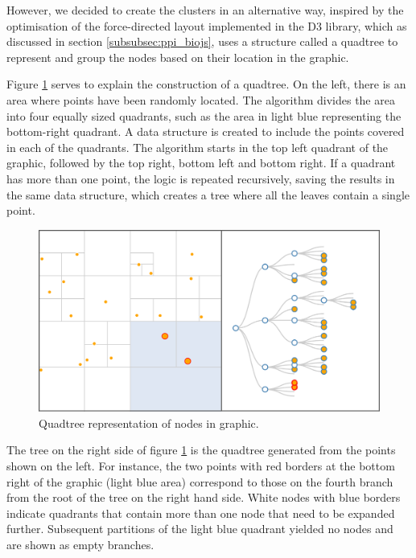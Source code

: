However, we decided to create the clusters in an alternative way, inspired by the optimisation of the force-directed layout implemented in the D3 library, which as discussed in section \ref{subsubsec:ppi_biojs}, uses a structure called a quadtree to represent and group the nodes based on their location in the graphic.
 
Figure \ref{fig:quadtree} serves to explain the construction of a quadtree. On the left, there is an area where points have been randomly located. The algorithm divides the area into four equally sized quadrants, such as the area in light blue representing the bottom-right quadrant. A data structure is created to include the points covered in each of the quadrants. The algorithm starts in the top left quadrant of the graphic, followed by the top right, bottom left and bottom right. If a quadrant has more than one point, the logic is repeated recursively, saving the results in the same data structure, which creates a tree where all the leaves contain a single point. 

\begin{figure}[ht]
\centering
\includegraphics[width=\textwidth]{figures/quadtree.png}
\caption[Quadtree representation of nodes in graphic.]{Quadtree representation of nodes in graphic. 
\label{fig:quadtree}}
\end{figure}


The tree on the right side of figure \ref{fig:quadtree} is the quadtree generated from the points shown on the left. For instance, the two points with red borders at the bottom right of the graphic (light blue area) correspond to those on the fourth branch from the root of the tree on the right hand side. White nodes with blue borders indicate quadrants that contain more than one node that need to be expanded further. Subsequent partitions  of the light blue quadrant yielded no nodes and are shown as empty branches.

